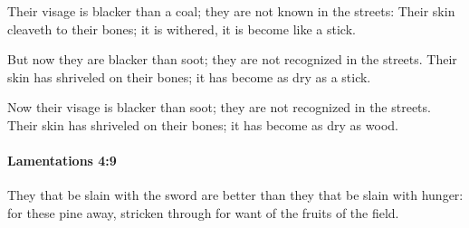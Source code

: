 			\begin{versebox}
					\item[BHS] 
					\item[LXX] 
					\item[ASV] Their visage is blacker than a coal; they are not known in the streets: Their skin cleaveth to their bones; it is withered, it is become like a stick.
					\item[NIV] But now they are blacker than soot; they are not recognized in the streets. Their skin has shriveled on their bones; it has become as dry as a stick.
					\item[NRSV] Now their visage is blacker than soot; they are not recognized in the streets. Their skin has shriveled on their bones; it has become as dry as wood.
			\end{versebox}

		\paragraph{Lamentations 4:9} %
			\label{LAMENTATIONS-4-9}

			They that be slain with the sword are better than they that be slain with hunger: for these pine away, stricken through for want of the fruits of the field.

